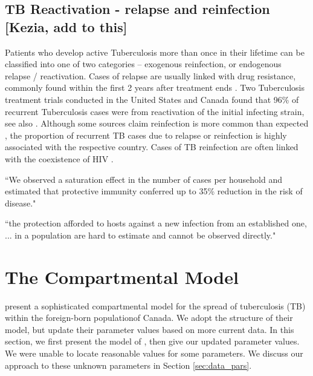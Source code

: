 \documentclass[sn-mathphys,Numbered]{sn-jnl}%
\theoremstyle{thmstyleone}%
\theoremstyle{thmstyletwo}%
\theoremstyle{thmstylethree}%
\begin{document}
     

 

\subsection{TB Reactivation - relapse and reinfection [Kezia, add to this]}

Patients who develop active Tuberculosis more than once in their lifetime can be classified into one of two categories -- exogenous reinfection, or endogenous relapse / reactivation. Cases of relapse are usually linked with drug resistance, commonly found within the first 2 years after treatment ends \cite{Zong2018RelapseChina} \cite{Guerra-Assunção2015RecurrenceFollow-up}. Two Tuberculosis treatment trials conducted in the United States and Canada found that 96\% of recurrent Tuberculosis cases were from reactivation of the initial infecting strain\cite{Benator2002RifapentineTrial}\cite{Vernon1999AcquiredConsortium}, see also \cite{Jasmer2004RecurrentReinfection} . Although some sources claim reinfection is more common than expected \cite{Hoey2002CanTwice}, the proportion of recurrent TB cases due to relapse or reinfection is highly associated with the respective country. Cases of TB reinfection are often linked with the coexistence of HIV \cite{Campbell2022ChapterInfection.}. 

\cite{Brooks-Pollock2011} ``We observed a saturation effect in the number of cases per household and estimated that protective immunity conferred up to 35\% reduction in the risk of disease."

\cite{Mulberry2020} ``the protection afforded to hosts against a new infection from an established one, ... in a population are hard to estimate and cannot be observed directly."  


\section{The Compartmental Model}\label{sec3}

\citet{Guo2011PersistentLatency} present a sophisticated compartmental model for the spread of tuberculosis (TB) within the foreign-born population\footnotemark of Canada. We adopt the structure of their model, but update their parameter values based on more current data. In this section, we first present the model of \citeauthor{Guo2011PersistentLatency}, then give our updated parameter values. We were unable to locate reasonable values for some parameters. We discuss our approach to these unknown parameters in Section \ref{sec:data_pars}.
\end{document}
